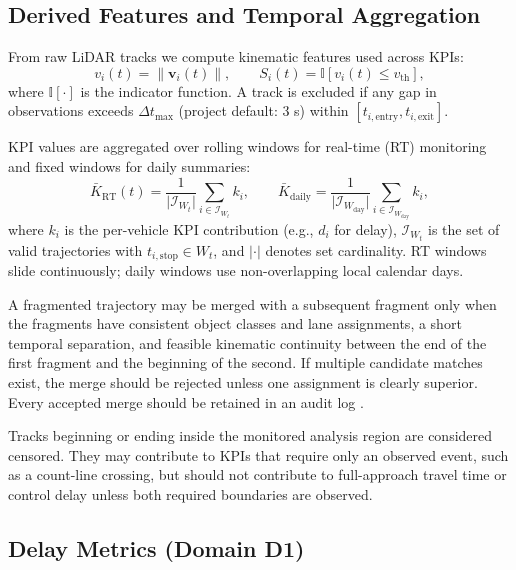 \documentclass[11pt]{article}
\newcommand{\ind}{\mathbb{I}}
\begin{document}
\subsection{Derived Features and Temporal Aggregation}

From raw LiDAR tracks we compute kinematic features used across KPIs:
\begin{equation}
 v_i(t)=\lVert\mathbf{v}_i(t)\rVert,\qquad
 S_i(t)=\ind\!\left[v_i(t)\leq v_{\mathrm{th}}\right],
\end{equation}
where $\ind[\cdot]$ is the indicator function. A track is excluded if any gap in observations exceeds $\Delta t_{\max}$ (project default: 3 s) within $[t_{i,\mathrm{entry}},t_{i,\mathrm{exit}}]$.

KPI values are aggregated over rolling windows for real-time (RT) monitoring and fixed windows for daily summaries:
\begin{equation}
 \bar K_{\mathrm{RT}}(t)=\frac{1}{\lvert\mathcal{I}_{W_t}\rvert}
 \sum_{i\in\mathcal{I}_{W_t}}k_i,
 \qquad
 \bar K_{\mathrm{daily}}=\frac{1}{\lvert\mathcal{I}_{W_{\mathrm{day}}}\rvert}
 \sum_{i\in\mathcal{I}_{W_{\mathrm{day}}}}k_i,
\end{equation}
where $k_i$ is the per-vehicle KPI contribution (e.g., $d_i$ for delay), $\mathcal{I}_{W_t}$ is the set of valid trajectories with $t_{i,\mathrm{stop}}\in W_t$, and $\lvert\cdot\rvert$ denotes set cardinality. RT windows slide continuously; daily windows use non-overlapping local calendar days.

A fragmented trajectory may be merged with a subsequent fragment only when
the fragments have consistent object classes and lane assignments, a short
temporal separation, and feasible kinematic continuity between the end of the
first fragment and the beginning of the second. If multiple candidate matches
exist, the merge should be rejected unless one assignment is clearly superior.
Every accepted merge should be retained in an audit log
\cite{kloeker2020multilidar,shang2026roadside}.

Tracks beginning or ending inside the monitored analysis region are considered
censored. They may contribute to KPIs that require only an observed event,
such as a count-line crossing, but should not contribute to full-approach
travel time or control delay unless both required boundaries are observed.

\subsection{Delay Metrics (Domain D1)}
\end{document}
